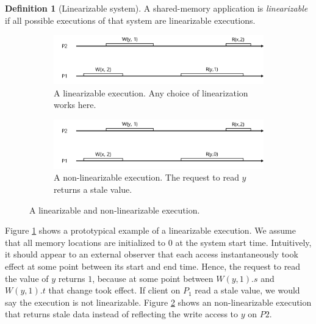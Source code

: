 \documentclass[]             %
{NASA}                       %
\theoremstyle{definition}
\newtheorem{definition}{Definition}[section]
\begin{document}
\begin{definition}[Linearizable system]
  A shared-memory application is \emph{linearizable} if all possible
  executions of that system are linearizable executions.
\end{definition}

\begin{figure}[p]
  \begin{subfigure}[a]{1\textwidth} \center
    \includegraphics[scale=0.4]{images/linear1.png} \caption{A
      linearizable execution. Any choice of linearization works here.}
    \label{fig:linear_example11} \end{subfigure}
  \begin{subfigure}[b]{1\textwidth} \center
    \includegraphics[scale=0.4]{images/nonlinear0.png} \caption{A
      non-linearizable execution. The request to read $y$ returns a
      stale value. } \label{fig:linear_example12} \end{subfigure}
  \caption{A linearizable and non-linearizable execution.}
  \label{fig:linear_example1} \end{figure}

Figure \ref{fig:linear_example11} shows a prototypical example of a
linearizable execution. We assume that all memory locations are
initialized to \(0\) at the system start time. Intuitively, it should
appear to an external observer that each access instantaneously took
effect at some point between its start and end time. Hence, the request
to read the value of \(y\) returns \(1\), because at some point between
\(W(y,1).s\) and \(W(y,1).t\) that change took effect. If client on
\(P_1\) read a stale value, we would say the execution is not
linearizable. Figure \ref{fig:linear_example12} shows an
non-linearizable execution that returns stale data instead of reflecting
the write access to \(y\) on \(P2\).
\end{document}
